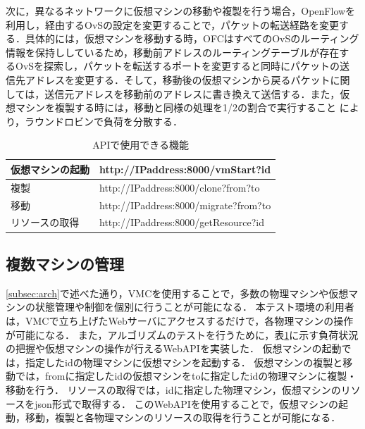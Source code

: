 \documentclass[submit,techrep]{ipsj}
\begin{document}
次に，異なるネットワークに仮想マシンの移動や複製を行う場合，OpenFlowを
利用し，経由するOvSの設定を変更することで，パケットの転送経路を変更す
る．具体的には，仮想マシンを移動する時，OFCはすべてのOvSのルーティング
情報を保持ししているため，移動前アドレスのルーティングテーブルが存在す
るOvSを探索し，パケットを転送するポートを変更すると同時にパケットの送
信先アドレスを変更する．そして，移動後の仮想マシンから戻るパケットに関
しては，送信元アドレスを移動前のアドレスに書き換えて送信する．また，仮
想マシンを複製する時には，移動と同様の処理を1/2の割合で実行すること
により，ラウンドロビンで負荷を分散する．

\begin{table}[tb]
	\centering
	\caption{APIで使用できる機能}
	\label{tab:api}
	{
		\small
		\begin{tabular}{|l|l|} \hline
		仮想マシンの起動 & http://IPaddress:8000/vmStart?id\\ \hline
		複製 & http://IPaddress:8000/clone?from?to\\ \hline
		移動 & http://IPaddress:8000/migrate?from?to\\ \hline
		リソースの取得 & http://IPaddress:8000/getResource?id\\ \hline
		\end{tabular}
	}
\end{table}
\subsection{複数マシンの管理}
\ref{subsec:arch}で述べた通り，VMCを使用することで，多数の物理マシンや仮想マシンの状態管理や制御を個別に行うことが可能になる．
本テスト環境の利用者は，VMCで立ち上げたWebサーバにアクセスするだけで，各物理マシンの操作が可能になる．
また，アルゴリズムのテストを行うために，表\ref{tab:api}に示す負荷状況の把握や仮想マシンの操作が行えるWebAPIを実装した．
仮想マシンの起動では，指定したidの物理マシンに仮想マシンを起動する．
仮想マシンの複製と移動では，fromに指定したidの仮想マシンをtoに指定したidの物理マシンに複製・移動を行う．
リソースの取得では，idに指定した物理マシン，仮想マシンのリソースをjson形式で取得する．
このWebAPIを使用することで，仮想マシンの起動，移動，複製と各物理マシンのリソースの取得を行うことが可能になる．



\end{document}
